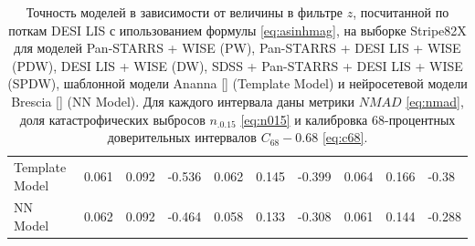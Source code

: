 \documentclass[fleqn,usenatbib]{mnras}
\begin{document}
\begin{table}
\begin{tabular}{llllllllll}
            Template Model &                        0.061 &           0.092 &          -0.536 &                                0.062 &           0.145 &          -0.399 &                                  0.064 &           0.166 &           -0.38 \\
            NN Model       &                        0.062 &           0.092 &          -0.464 &                                0.058 &           0.133 &          -0.308 &                                  0.061 &           0.144 &          -0.288 \\
            \hline
            \end{tabular}
            \caption{Точность моделей в зависимости от величины в фильтре $z$, посчитанной по поткам DESI LIS с ипользованием формулы \eqref{eq:asinhmag}, на выборке Stripe82X для моделей Pan-STARRS + WISE (PW), Pan-STARRS + DESI LIS + WISE (PDW), DESI LIS + WISE (DW), SDSS + Pan-STARRS + DESI LIS + WISE (SPDW), шаблонной модели Ananna \ref{} (Template Model) и нейросетевой модели Brescia \ref{} (NN Model). Для каждого интервала даны метрики $NMAD$ \eqref{eq:nmad}, доля катастрофических выбросов $n_{.0.15}$ \eqref{eq:n015} и калибровка 68-процентных доверительных интервалов $C_{68} - 0.68$ \eqref{eq:c68}.}
\end{table}
\end{document}

